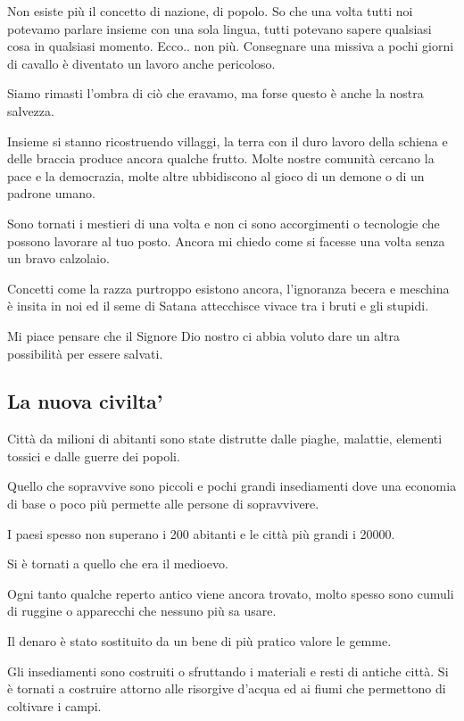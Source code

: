 \documentclass[12pt,a4paper,twoside,openany]{book}
\begin{document}
\begin{multicols}{2}
Non esiste più il concetto di nazione, di popolo. So che una volta tutti noi potevamo parlare insieme con una sola lingua, tutti potevano sapere qualsiasi cosa in qualsiasi momento.
Ecco.. non più. Consegnare una missiva a pochi giorni di cavallo è diventato un lavoro anche pericoloso.

Siamo rimasti l'ombra di ciò che eravamo, ma forse questo è anche la nostra salvezza. 

Insieme si stanno ricostruendo villaggi, la terra con il duro lavoro della schiena e delle braccia produce ancora qualche frutto.
Molte nostre comunità cercano la pace e la democrazia, molte altre ubbidiscono al gioco di un demone o di un padrone umano.

Sono tornati i mestieri di una volta e non ci sono accorgimenti o tecnologie che possono lavorare al tuo posto. Ancora mi chiedo come si facesse una volta senza un bravo calzolaio. 

Concetti come la razza purtroppo esistono ancora, l'ignoranza becera e meschina è insita in noi ed il seme di Satana attecchisce vivace tra i bruti e gli stupidi.

Mi piace pensare che il Signore Dio nostro ci abbia voluto dare un altra possibilità per essere salvati.

\subsection{La nuova civilta'}

Città da milioni di abitanti sono state distrutte dalle piaghe, malattie, elementi tossici e dalle guerre dei popoli. 

Quello che sopravvive sono piccoli e pochi grandi insediamenti dove una economia di base o poco più permette alle persone di sopravvivere.

I paesi spesso non superano i 200 abitanti e le città più grandi i 20000.

Si è tornati a quello che era il medioevo.

Ogni tanto qualche reperto antico viene ancora trovato, molto spesso sono cumuli di ruggine o apparecchi che nessuno più sa usare.

Il denaro è stato sostituito da un bene di più pratico valore le gemme.

Gli insediamenti sono costruiti o sfruttando i materiali e resti di antiche città. Si è tornati a costruire attorno alle risorgive d'acqua ed ai fiumi che permettono di coltivare i campi.


\end{multicols}
\end{document}
